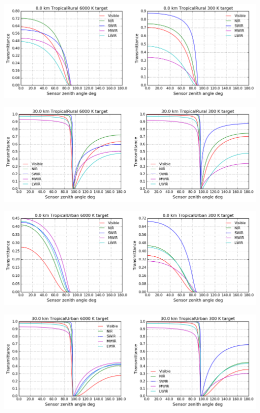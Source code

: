 \documentclass{workpackage}
\begin{document}
\begin{center}
\includegraphics{./pic/Analyse-Standard-Atmospheres_43_14.png}
\end{center}

\begin{center}
\includegraphics{./pic/Analyse-Standard-Atmospheres_43_15.png}
\end{center}

\begin{center}
\includegraphics{./pic/Analyse-Standard-Atmospheres_43_16.png}
\end{center}

\begin{center}
\includegraphics{./pic/Analyse-Standard-Atmospheres_43_17.png}
\end{center}
\end{document}
